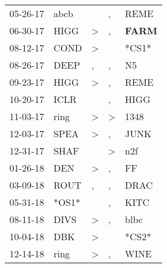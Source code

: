 \begin{supertabular}{p{0.07\textwidth}p{0.06\textwidth}p{0.02\textwidth}p{0.02\textwidth}p{0.06\textwidth}}
 05-26-17\textsuperscript{} &           abcb\textsuperscript{} &                  &             , &           REME\textsuperscript{} \\
 06-30-17\textsuperscript{} &           HIGG\textsuperscript{} &     \textgreater &             , &  \textbf{FARM\textsuperscript{}} \\
 08-12-17\textsuperscript{} &           COND\textsuperscript{} &     \textgreater &               &                            *CS1* \\
 08-26-17\textsuperscript{} &           DEEP\textsuperscript{} &                , &             , &             N5\textsuperscript{} \\
 09-23-17\textsuperscript{} &           HIGG\textsuperscript{} &     \textgreater &             , &           REME\textsuperscript{} \\
 10-20-17\textsuperscript{} &           ICLR\textsuperscript{} &                  &             , &           HIGG\textsuperscript{} \\
 11-03-17\textsuperscript{} &           ring\textsuperscript{} &     \textgreater &  \textgreater &           1348\textsuperscript{} \\
 12-03-17\textsuperscript{} &           SPEA\textsuperscript{} &     \textgreater &             , &           JUNK\textsuperscript{} \\
 12-31-17\textsuperscript{} &           SHAF\textsuperscript{} &                  &  \textgreater &            n2f\textsuperscript{} \\
 01-26-18\textsuperscript{} &            DEN\textsuperscript{} &     \textgreater &             , &             FF\textsuperscript{} \\
 03-09-18\textsuperscript{} &           ROUT\textsuperscript{} &                , &             , &           DRAC\textsuperscript{} \\
 05-31-18\textsuperscript{} &                            *OS1* &                  &             , &           KITC\textsuperscript{} \\
 08-11-18\textsuperscript{} &           DIVS\textsuperscript{} &     \textgreater &             , &           blbc\textsuperscript{} \\
 10-04-18\textsuperscript{} &            DBK\textsuperscript{} &     \textgreater &               &                            *CS2* \\
 12-14-18\textsuperscript{} &           ring\textsuperscript{} &     \textgreater &             , &           WINE\textsuperscript{} \\

\end{supertabular}
